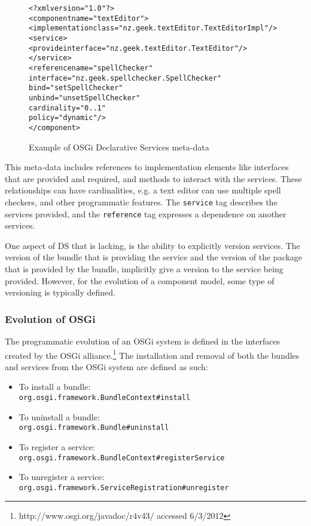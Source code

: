 \begin{figure}[htp]
\begin{center}
\begin{alltt}
<?xml version="1.0"?>
<component name="textEditor">
    <implementation class="nz.geek.textEditor.TextEditorImpl"/>
    <service>
        <provide interface="nz.geek.textEditor.TextEditor"/>
    </service>
    <reference name="spellChecker"
        interface="nz.geek.spellchecker.SpellChecker"
        bind="setSpellChecker"
        unbind="unsetSpellChecker"
        cardinality="0..1"
        policy="dynamic"/>
</component>
\end{alltt}
  \caption[OSGi Declarative Services]{Example of OSGi Declarative Services meta-data}
  \label{dsmetadata}
\end{center}
\end{figure}

This meta-data includes references to implementation elements like interfaces that are provided and required, and methods to interact with the services.
These relationships can have cardinalities, e.g. a text editor can use multiple spell checkers, and other programmatic features.
The \texttt{service} tag describes the services provided, and the \texttt{reference} tag expresses a dependence on another services.

One aspect of DS that is lacking, is the ability to explicitly version services.
The version of the bundle that is providing the service and the version of the package that is provided by the bundle, implicitly give a version to the service being provided.
However, for the evolution of a component model, some type of versioning is typically defined.

\subsubsection{Evolution of OSGi}
The programmatic evolution of an OSGi system is defined in the interfaces created by the OSGi alliance.\footnote{http://www.osgi.org/javadoc/r4v43/ accessed 6/3/2012}
The installation and removal of both the bundles and services from the OSGi system are defined as such:
 
\begin{itemize}
  \item To install a bundle:\\ \texttt{org.osgi.framework.BundleContext}\verb+#+\texttt{install}
  \item To uninstall a bundle:\\ \texttt{org.osgi.framework.Bundle}\verb+#+\texttt{uninstall}
  \item To register a service: \\ \texttt{org.osgi.framework.BundleContext}\verb+#+\texttt{registerService}
  \item To unregister a service: \\ \texttt{org.osgi.framework.ServiceRegistration}\verb+#+\texttt{unregister}
\end{itemize}

